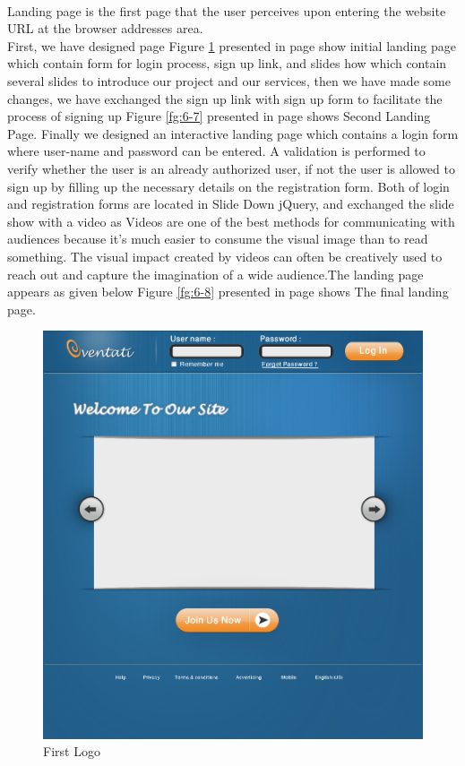 \documentclass[12pt,a4paper,class,twoside,openany]{report}
\begin{document}
{ \paragraph*{\hspace{.9 cm} } Landing page is the first page that the user perceives upon entering the website URL at the browser addresses area.\\
First, we have designed page Figure \ref{fg:6-6} presented in page \pageref{fg:6-6} show initial landing page which contain form for login process, sign up link, and slides how which contain several slides to introduce our project and our services, then we have made some changes, we have exchanged the sign up link with sign up form to facilitate the process of signing up Figure \ref{fg:6-7} presented in page \pageref{fg:6-7} shows Second Landing Page.
Finally we designed an interactive landing page which contains a login form where user-name and password can be entered. A validation is performed to verify whether the user is an already authorized user, if not the user is allowed to sign up by filling up the necessary details on the registration form. Both of login and registration forms are located in Slide Down jQuery, and exchanged the slide show with a video as Videos are one of the best methods for communicating with audiences because it's much easier to consume the visual image than to read something. The visual impact created by videos can often be creatively used to reach out and capture the imagination of a wide audience.The landing page appears as given below Figure \ref{fg:6-8} presented in page \pageref{fg:6-8} shows The final landing page.
 \begin{figure}
	\begin{minipage}[b]{0.5\linewidth}
	\centering
	\includegraphics[height=2.5 in]{6-6}
	\caption{First Logo }
	\label{fg:6-6}
	\end{minipage}
	\hspace{0.5cm}

\end{figure}}
\end{document}
